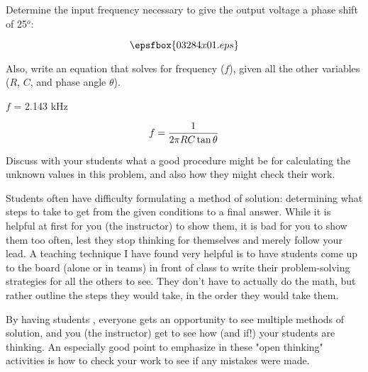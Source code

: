 

Determine the input frequency necessary to give the output voltage a phase shift of 25$^{o}$:

$$\epsfbox{03284x01.eps}$$

Also, write an equation that solves for frequency ($f$), given all the other variables ($R$, $C$, and phase angle $\theta$).







$f$ = 2.143 kHz

$$f = {1 \over {2 \pi R C \tan \theta}}$$







Discuss with your students what a good procedure might be for calculating the unknown values in this problem, and also how they might check their work.

\vskip 10pt

Students often have difficulty formulating a method of solution: determining what steps to take to get from the given conditions to a final answer.  While it is helpful at first for you (the instructor) to show them, it is bad for you to show them too often, lest they stop thinking for themselves and merely follow your lead.  A teaching technique I have found very helpful is to have students come up to the board (alone or in teams) in front of class to write their problem-solving strategies for all the others to see.  They don't have to actually do the math, but rather outline the steps they would take, in the order they would take them.

By having students , everyone gets an opportunity to see multiple methods of solution, and you (the instructor) get to see how (and if!) your students are thinking.  An especially good point to emphasize in these "open thinking" activities is how to check your work to see if any mistakes were made.





